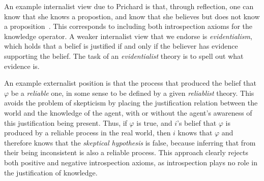 An example internalist view due to Prichard	 is that, through reflection, one can know that she knows a propostion, and know that she believes but does not know a proposition~\cite{Prichard}. This corresponds to including both introspection axioms for the knowledge operator. A weaker internalist view that we endorse is \emph{evidentialism}, which holds that a belief is justified if and only if the believer has evidence supporting the belief. The task of an \emph{evidentialist} theory is to spell out what evidence is.

An example externalist position is that the process that produced the belief that $\varphi$ be a \emph{reliable} one, in some sense to be defined by a given \emph{reliablist} theory. This avoids the problem of skepticism by placing the justification relation between the world and the knowledge of the agent, with or without the agent's awareness of this justification being present. Thus, if $\varphi$ is true, and $i$'s belief that $\varphi$ is produced by a reliable process in the real world, then $i$ knows that $\varphi$ and therefore knows that the \emph{skeptical hypothesis} is false, because inferring that from their being inconsistent is also a reliable process. This approach clearly rejects both positive and negative introspection axioms, as introspection plays no role in the justification of knowledge.


